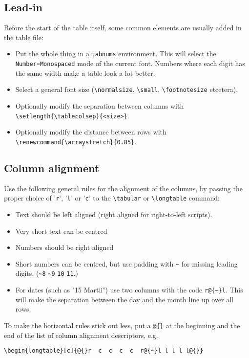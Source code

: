 \documentclass{report}
\begin{document}
\subsection{Lead-in}
Before the start of the table itself, some common elements are usually
added in the table file:
\begin{itemize}
\item Put the whole thing in a \verb+tabnums+ environment.
This will select the \verb+Number=Monospaced+ mode of the current font.
Numbers where each digit has the same width make a table look a lot better.
\item Select a general font size (\verb+\normalsize+, \verb+\small+,
\verb+\footnotesize+ etcetera).
\item Optionally modify the separation between columns with
\verb+\setlength{\tablecolsep}{<size>}+.
\item Optionally modify the distance between rows with
\verb+\renewcommand{\arraystretch}{0.85}+.
\end{itemize}

\subsection{Column alignment}
Use the following general rules for the alignment of the columns,
by passing the proper choice of '\verb+r+', '\verb+l+' or '\verb+c+'
 to the \verb+\tabular+ or \verb+\longtable+ command:
\begin{itemize}
\item Text should be left aligned (right aligned for right-to-left scripts).
\item Very short text can be centred
\item Numbers should be right aligned
\item Short numbers can be centred, but use padding with \verb+~+ for missing
leading digits. (\verb+~8+ \verb+~9+ \verb+10+ \verb+11+.)
\item For dates (such as "15 Martii") use two columns with the code
\verb+r@{~}l+.
This will make the separation between the day and the month line up
over all rows.
\end{itemize}

To make the horizontal rules stick out less, put a \verb+@{}+ at the beginning
and the end of the list of column alignment descriptors, e.g.
\begin{verbatim}
\begin{longtable}[c]{@{}r  c  c  c  c  r@{~}l l l l l@{}}
\end{verbatim}
\end{document}
